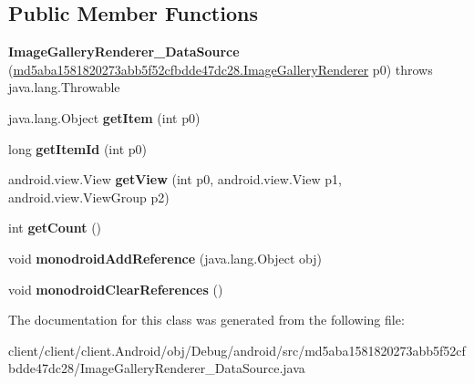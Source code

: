 \subsection*{Public Member Functions}
\begin{DoxyCompactItemize}
\item 
\hypertarget{classmd5aba1581820273abb5f52cfbdde47dc28_1_1ImageGalleryRenderer__DataSource_a7f823ff71119e08498c1e13d491bda99}{}{\bfseries Image\+Gallery\+Renderer\+\_\+\+Data\+Source} (\hyperlink{classmd5aba1581820273abb5f52cfbdde47dc28_1_1ImageGalleryRenderer}{md5aba1581820273abb5f52cfbdde47dc28.\+Image\+Gallery\+Renderer} p0)  throws java.\+lang.\+Throwable 	\label{classmd5aba1581820273abb5f52cfbdde47dc28_1_1ImageGalleryRenderer__DataSource_a7f823ff71119e08498c1e13d491bda99}

\item 
\hypertarget{classmd5aba1581820273abb5f52cfbdde47dc28_1_1ImageGalleryRenderer__DataSource_a13cc28c0911459b08e235b40fd222a4f}{}java.\+lang.\+Object {\bfseries get\+Item} (int p0)\label{classmd5aba1581820273abb5f52cfbdde47dc28_1_1ImageGalleryRenderer__DataSource_a13cc28c0911459b08e235b40fd222a4f}

\item 
\hypertarget{classmd5aba1581820273abb5f52cfbdde47dc28_1_1ImageGalleryRenderer__DataSource_ac2a0a21a1e1a6c87cffbe935137d6faf}{}long {\bfseries get\+Item\+Id} (int p0)\label{classmd5aba1581820273abb5f52cfbdde47dc28_1_1ImageGalleryRenderer__DataSource_ac2a0a21a1e1a6c87cffbe935137d6faf}

\item 
\hypertarget{classmd5aba1581820273abb5f52cfbdde47dc28_1_1ImageGalleryRenderer__DataSource_a72c9e9d2b7dd64fbd7972f5078bd3b0b}{}android.\+view.\+View {\bfseries get\+View} (int p0, android.\+view.\+View p1, android.\+view.\+View\+Group p2)\label{classmd5aba1581820273abb5f52cfbdde47dc28_1_1ImageGalleryRenderer__DataSource_a72c9e9d2b7dd64fbd7972f5078bd3b0b}

\item 
\hypertarget{classmd5aba1581820273abb5f52cfbdde47dc28_1_1ImageGalleryRenderer__DataSource_ac28dabd37330c1553449b9678ea273b4}{}int {\bfseries get\+Count} ()\label{classmd5aba1581820273abb5f52cfbdde47dc28_1_1ImageGalleryRenderer__DataSource_ac28dabd37330c1553449b9678ea273b4}

\item 
\hypertarget{classmd5aba1581820273abb5f52cfbdde47dc28_1_1ImageGalleryRenderer__DataSource_a2802048d793693e6303996d25dd39f90}{}void {\bfseries monodroid\+Add\+Reference} (java.\+lang.\+Object obj)\label{classmd5aba1581820273abb5f52cfbdde47dc28_1_1ImageGalleryRenderer__DataSource_a2802048d793693e6303996d25dd39f90}

\item 
\hypertarget{classmd5aba1581820273abb5f52cfbdde47dc28_1_1ImageGalleryRenderer__DataSource_ae57a6c3b40ce5b4f41ca975be337841a}{}void {\bfseries monodroid\+Clear\+References} ()\label{classmd5aba1581820273abb5f52cfbdde47dc28_1_1ImageGalleryRenderer__DataSource_ae57a6c3b40ce5b4f41ca975be337841a}

\end{DoxyCompactItemize}


The documentation for this class was generated from the following file\+:\begin{DoxyCompactItemize}
\item 
client/client/client.\+Android/obj/\+Debug/android/src/md5aba1581820273abb5f52cfbdde47dc28/Image\+Gallery\+Renderer\+\_\+\+Data\+Source.\+java\end{DoxyCompactItemize}
